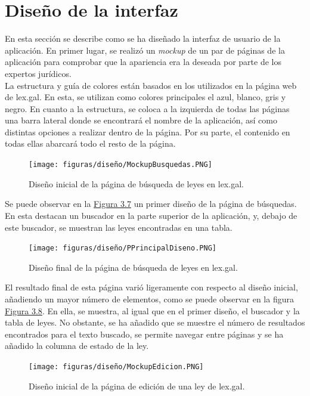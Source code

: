 \section{Diseño de la interfaz}

En esta sección se describe como se ha diseñado la interfaz de usuario de la aplicación. En primer lugar, se realizó un {\it mockup} \cite{mockup} de un par de páginas de la aplicación para comprobar que la apariencia era la deseada por parte de los expertos jurídicos.
\\

La estructura y guía de colores están basados en los utilizados en la página web de lex.gal. En esta, se utilizan como colores principales el azul, blanco, gris y negro. En cuanto a la estructura, se coloca a la izquierda de todas las páginas una barra lateral donde se encontrará el nombre de la aplicación, así como distintas opciones a realizar dentro de la página. Por su parte, el contenido en todas ellas abarcará todo el resto de la página.

\begin{figure}[H]
\centerline{\texttt{[image: figuras/diseño/MockupBusquedas.PNG]}}
\caption{Diseño inicial de la página de búsqueda de leyes en lex.gal.}
\label{enlaceMockupPrincipalDiseno}
\end{figure}

Se puede observar en la \hyperref[enlaceMockupPrincipalDiseno]{Figura 3.7} un primer diseño de la página de búsquedas. En esta destacan un buscador en la parte superior de la aplicación, y, debajo de este buscador, se muestran las leyes encontradas en una tabla.

\begin{figure}[H]
\centerline{\texttt{[image: figuras/diseño/PPrincipalDiseno.PNG]}}
\caption{Diseño final de la página de búsqueda de leyes en lex.gal.}
\label{enlacePPrincipalDiseno}
\end{figure}

El resultado final de esta página varió ligeramente con respecto al diseño inicial, añadiendo un mayor número de elementos, como se puede observar en la figura \hyperref[enlacePPrincipalDiseno]{Figura 3.8}. En ella, se muestra, al igual que en el primer diseño, el buscador y la tabla de leyes. No obstante, se ha añadido que se muestre el número de resultados encontrados para el texto buscado, se permite navegar entre páginas y se ha añadido la columna de estado de la ley.

\begin{figure}[H]
\centerline{\texttt{[image: figuras/diseño/MockupEdicion.PNG]}}
\caption{Diseño inicial de la página de edición de una ley de lex.gal.}
\label{enlaceMockupEdicionDiseno}
\end{figure}

